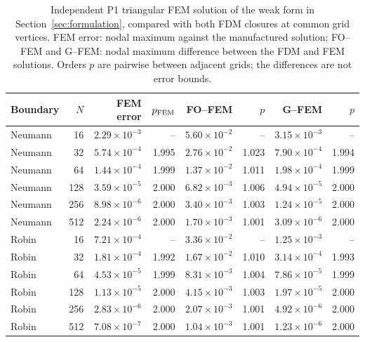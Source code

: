 \begin{table}[htbp]
\centering
\scriptsize
\setlength{\tabcolsep}{4pt}
\begin{tabular}{lrrrrrrr}
\toprule
Boundary & $N$ & FEM error & $p_{\rm FEM}$ & FO--FEM & $p$ & G--FEM & $p$ \\
\midrule
Neumann & 16 & $2.29\times10^{-3}$ & -- & $5.60\times10^{-2}$ & -- & $3.15\times10^{-3}$ & -- \\
Neumann & 32 & $5.74\times10^{-4}$ & 1.995 & $2.76\times10^{-2}$ & 1.023 & $7.90\times10^{-4}$ & 1.994 \\
Neumann & 64 & $1.44\times10^{-4}$ & 1.999 & $1.37\times10^{-2}$ & 1.011 & $1.98\times10^{-4}$ & 1.999 \\
Neumann & 128 & $3.59\times10^{-5}$ & 2.000 & $6.82\times10^{-3}$ & 1.006 & $4.94\times10^{-5}$ & 2.000 \\
Neumann & 256 & $8.98\times10^{-6}$ & 2.000 & $3.40\times10^{-3}$ & 1.003 & $1.24\times10^{-5}$ & 2.000 \\
Neumann & 512 & $2.24\times10^{-6}$ & 2.000 & $1.70\times10^{-3}$ & 1.001 & $3.09\times10^{-6}$ & 2.000 \\
Robin & 16 & $7.21\times10^{-4}$ & -- & $3.36\times10^{-2}$ & -- & $1.25\times10^{-3}$ & -- \\
Robin & 32 & $1.81\times10^{-4}$ & 1.992 & $1.67\times10^{-2}$ & 1.010 & $3.14\times10^{-4}$ & 1.993 \\
Robin & 64 & $4.53\times10^{-5}$ & 1.999 & $8.31\times10^{-3}$ & 1.004 & $7.86\times10^{-5}$ & 1.999 \\
Robin & 128 & $1.13\times10^{-5}$ & 2.000 & $4.15\times10^{-3}$ & 1.003 & $1.97\times10^{-5}$ & 2.000 \\
Robin & 256 & $2.83\times10^{-6}$ & 2.000 & $2.07\times10^{-3}$ & 1.001 & $4.92\times10^{-6}$ & 2.000 \\
Robin & 512 & $7.08\times10^{-7}$ & 2.000 & $1.04\times10^{-3}$ & 1.001 & $1.23\times10^{-6}$ & 2.000 \\
\bottomrule
\end{tabular}
\caption{Independent P1 triangular FEM solution of the weak form in Section~\ref{sec:formulation}, compared with both FDM closures at common grid vertices. FEM error: nodal maximum against the manufactured solution; FO--FEM and G--FEM: nodal maximum difference between the FDM and FEM solutions. Orders $p$ are pairwise between adjacent grids; the differences are not error bounds.}
\label{tab:fem-oracle}
\end{table}
